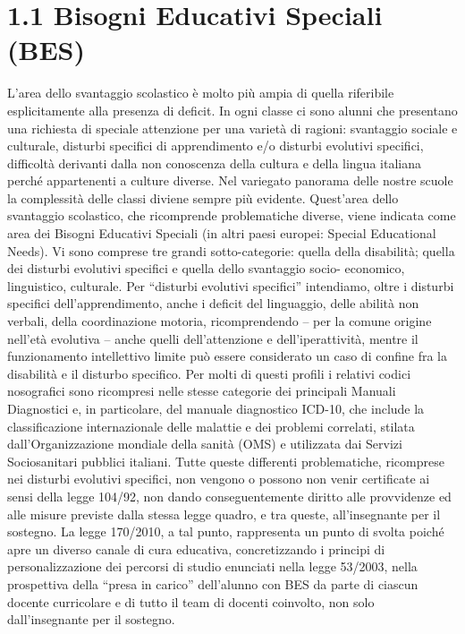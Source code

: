 \section*{1.1 Bisogni Educativi Speciali (BES)}
L'area dello svantaggio scolastico è molto più ampia di quella riferibile esplicitamente alla presenza di
deficit. In ogni classe ci sono alunni che presentano una richiesta di speciale attenzione per una varietà di
ragioni: svantaggio sociale e culturale, disturbi specifici di apprendimento e/o disturbi evolutivi specifici,
difficoltà derivanti dalla non conoscenza della cultura e della lingua italiana perché appartenenti a culture
diverse. Nel variegato panorama delle nostre scuole la complessità delle classi diviene sempre più evidente.
Quest'area dello svantaggio scolastico, che ricomprende problematiche diverse, viene indicata come area dei
Bisogni Educativi Speciali (in altri paesi europei: Special Educational Needs). Vi sono comprese tre grandi
sotto-categorie: quella della disabilità; quella dei disturbi evolutivi specifici e quella dello svantaggio socio-
economico, linguistico, culturale.
Per “disturbi evolutivi specifici” intendiamo, oltre i disturbi specifici dell'apprendimento, anche i deficit del
linguaggio, delle abilità non verbali, della coordinazione motoria, ricomprendendo – per la comune origine
nell'età evolutiva – anche quelli dell'attenzione e dell'iperattività, mentre il funzionamento intellettivo limite
può essere considerato un caso di confine fra la disabilità e il disturbo specifico. Per molti di questi profili i
relativi codici nosografici sono ricompresi nelle stesse categorie dei principali Manuali Diagnostici e, in
particolare, del manuale diagnostico ICD-10, che include la classificazione internazionale delle malattie e dei
problemi correlati, stilata dall'Organizzazione mondiale della sanità (OMS) e utilizzata dai Servizi Sociosanitari
pubblici italiani.
Tutte queste differenti problematiche, ricomprese nei disturbi evolutivi specifici, non vengono o possono non
venir certificate ai sensi della legge 104/92, non dando conseguentemente diritto alle provvidenze ed alle
misure previste dalla stessa legge quadro, e tra queste, all'insegnante per il sostegno.
La legge 170/2010, a tal punto, rappresenta un punto di svolta poiché apre un diverso canale di cura
educativa, concretizzando i principi di personalizzazione dei percorsi di studio enunciati nella legge 53/2003,
nella prospettiva della “presa in carico” dell'alunno con BES da parte di ciascun docente curricolare e di
tutto il team di docenti coinvolto, non solo dall'insegnante per il sostegno.
